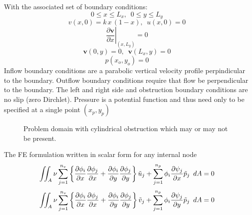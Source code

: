 \documentclass[wrr]{agutex}  %
\newcommand{\p}{\partial}
\begin{document}
\begin{article}
With the associated set of boundary conditions:
\begin{equation}0\leq x\leq L_x ,\,\,\,0\leq y\leq L_y\end{equation}
\begin{equation}v(x,0)=k\,x\,(1-x),\,\,\,u(x,0)=0\end{equation}
\begin{equation}\left.\frac{\partial \mathbf{v}}{\p x}\right|_{(x,L_y)}=0\end{equation}
\begin{equation}\mathbf{v}(0,y)=0,\,\,\,\mathbf{v}(L_x,y)=0\end{equation}
\begin{equation}p(x_o,y_o)=0\end{equation}
Inflow boundary conditions are a parabolic vertical velocity profile perpindicular to the boundary.  Outflow boundary conditions require that flow be perpendicular to the boundary. The left and right side and obstruction boundary conditions are no slip (zero Dirchlet).  Pressure is a potential function and thus need only to be specified at a single point $(x_p,y_p)$

\begin{figure}[h]
\begin{center}
\end{center}
\caption{Problem domain with cylindrical obstruction which may or may not be present.}\label{fig:tri}
\end{figure}

The FE formulation written in scalar form for any internal node 
\begin{equation}
  \iint_A \nu \sum_{j=1}^{n_v}\left\{{\p\phi_i\over\p x}{\p\phi_j\over\p x}+{\p \phi_i\over\p y}{\p\phi_j\over\p y}\right\}\tilde{u}_j
  + \sum_{j=1}^{n_p}\phi_i\frac{\p \psi_j}{\p x}\tilde{p}_j\,\,\,dA  = 0\label{eqn:full222}
\end{equation}
\begin{equation}
  \iint_A \nu \sum_{j=1}^{n_v}\left\{{\p\phi_i\over\p x}{\p\phi_j\over\p x}+{\p \phi_i\over\p y}{\p\phi_j\over\p y}\right\}\tilde{v}_j
  + \sum_{j=1}^{n_p}\phi_i\frac{\p \psi_j}{\p y}\tilde{p}_j\,\,\,dA  = 0\label{eqn:full222}
\end{equation}


\end{article}
\end{document}
